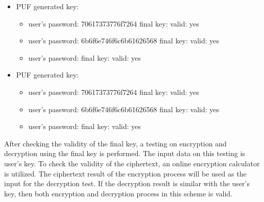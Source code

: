 \begin{itemize}
  \item PUF generated key: 
  \begin{itemize}
    \item user's password: 70617373776f7264\newline
    final key: \newline
    valid: yes
    \item user's password: 6b6f6e746f6c6b61626568\newline
    final key: \newline
    valid: yes
    \item user's password: \newline
    final key: \newline
    valid: yes
  \end{itemize}
  \item PUF generated key: 
  \begin{itemize}
    \item user's password: 70617373776f7264\newline
    final key: \newline
    valid: yes
    \item user's password: 6b6f6e746f6c6b61626568\newline
    final key: \newline
    valid: yes
    \item user's password: \newline
    final key: \newline
    valid: yes
  \end{itemize}
\end{itemize}

After checking the validity of the final key, a testing on encryption and decryption using the final key is performed. The input data on this testing is user’s key. To check the validity of the ciphertext, an online encryption calculator \cite{aes_calculator} is utilized. The ciphertext result of the encryption process will be used as the input for the decryption test. If the decryption result is similar with the user’s key, then both encryption and decryption process in this scheme is valid.

